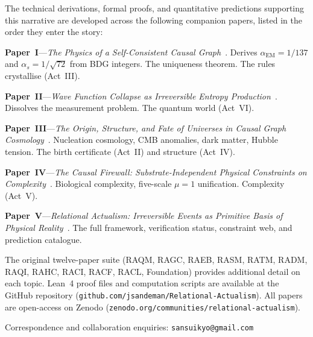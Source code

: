\documentclass[12pt,a4paper]{article}
\begin{document}
The technical derivations, formal proofs, and quantitative predictions supporting this narrative are developed across the following companion papers, listed in the order they enter the story:

\textbf{Paper~I}---\emph{The Physics of a Self-Consistent Causal Graph}~\cite{P1}. Derives $\alpha_{\mathrm{EM}} = 1/137$ and $\alpha_s = 1/\sqrt{72}$ from BDG integers. The uniqueness theorem. The rules crystallise (Act~III).

\textbf{Paper~II}---\emph{Wave Function Collapse as Irreversible Entropy Production}~\cite{P2}. Dissolves the measurement problem. The quantum world (Act~VI).

\textbf{Paper~III}---\emph{The Origin, Structure, and Fate of Universes in Causal Graph Cosmology}~\cite{P3}. Nucleation cosmology, CMB anomalies, dark matter, Hubble tension. The birth certificate (Act~II) and structure (Act~IV).

\textbf{Paper~IV}---\emph{The Causal Firewall: Substrate-Independent Physical Constraints on Complexity}~\cite{P4}. Biological complexity, five-scale $\mu=1$ unification. Complexity (Act~V).

\textbf{Paper~V}---\emph{Relational Actualism: Irreversible Events as Primitive Basis of Physical Reality}~\cite{P5}. The full framework, verification status, constraint web, and prediction catalogue.

The original twelve-paper suite (RAQM, RAGC, RAEB, RASM, RATM, RADM, RAQI, RAHC, RACI, RACF, RACL, Foundation) provides additional detail on each topic. Lean~4 proof files and computation scripts are available at the GitHub repository (\texttt{github.com/jsandeman/Relational-Actualism}). All papers are open-access on Zenodo (\texttt{zenodo.org/communities/relational-actualism}).

Correspondence and collaboration enquiries: \texttt{sansuikyo@gmail.com}
\end{document}
